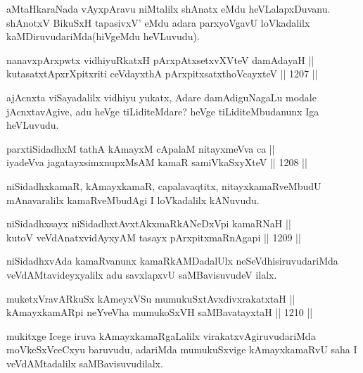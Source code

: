 \begin{artha}
aMtaHkaraNada vAyxpAravu niMtalilx shAnatx eMdu heVLalapxDuvanu. shAnotxV BikuSxH tapasivxV' eMdu adara parxyoVgavU loVkadalilx kaMDiruvudariMda(hiVgeMdu heVLuvudu).
\end{artha}


\begin{shl}
nanavxpArxpwtx vidhiyuRkatxH pArxpAtxsetxvXVteV damAdayaH || \\
kutasatxtApxrXpitxriti ceVdayxthA pArxpitxsatxthoVcayxteV \hfill || 1207 ||  
\end{shl}

\begin{artha}
ajAcnxta viSayadalilx vidhiyu yukatx, Adare damAdiguNagaLu modale jAcnxtavAgive, adu heVge tiLiditeMdare? heVge tiLiditeMbudanunx Iga heVLuvudu.
\end{artha}

\begin{shl}
parxtiSidadhxM tathA kAmayxM cApalaM nitayxmeVva ca || \\
iyadeVva jagatayxsimxnupxMsAM kamaR samiVkaSxyXteV \hfill || 1208 ||  
\end{shl}

\begin{artha}
niSidadhxkamaR, kAmayxkamaR, capalavaqtitx, nitayxkamaRveMbudU mAnavaralilx kamaRveMbudAgi I loVkadalilx kANuvudu.
\end{artha}

\begin{shl}
niSidadhxsayx niSidadhxtAvxtAkxmaRkANeDxV\s pi kamaRNaH || \\
kutoV veVdAnatxvidAyxyAM tasayx pArxpitxmaRnAgapi \hfill || 1209 ||  
\end{shl}

\begin{artha}
niSidadhxvAda kamaRvanunx kamaRkAMDadalUlx neSeVdhisiruvudariMda veVdAMtavideyxyalilx adu savxlapxvU saMBavisuvudeV ilalx.
\end{artha}

\begin{shl}
muketxVravARkuSx kAmeyxVSu mumukuSxtAvxdivxrakatxtaH || \\
kAmayxkamARpi neYveVha mumukoSxVH saMBavatayxtaH \hfill || 1210 ||  
\end{shl}

\begin{artha}
mukitxge Icege iruva kAmayxkamaRgaLalilx virakatxvAgiruvudariMda moVkeSxVceCxyu baruvudu, adariMda mumukuSxvige kAmayxkamaRvU saha I veVdAMtadalilx saMBavisuvudilalx.
\end{artha}

